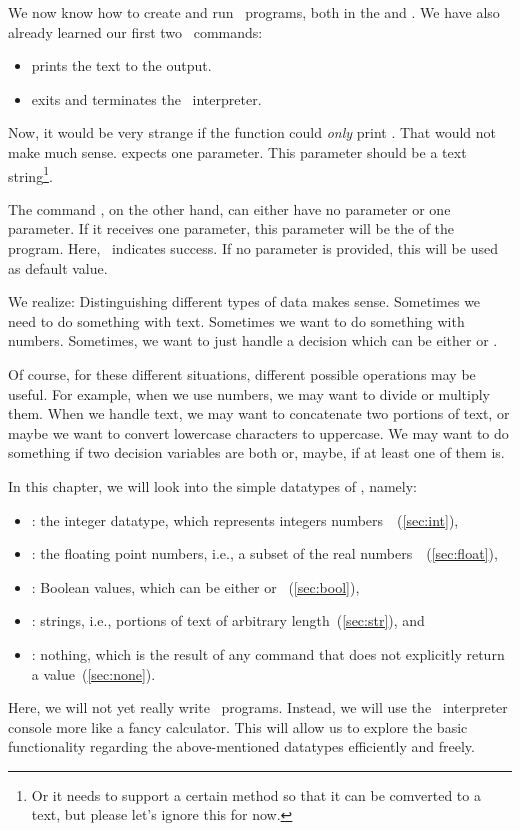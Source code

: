 %
%
We now know how to create and run \python\ programs, both in the  and .
We have also already learned our first two \python\ commands:%
%
\begin{itemize}%
\item {} prints the text  to the output.
\item {} exits and terminates the \python\ interpreter.%
\end{itemize}%
%
Now, it would be very strange if the  function could \emph{only} print .
That would not make much sense.
 expects one parameter.
This parameter should be a text string\footnote{Or it needs to support a certain method so that it can be comverted to a text, but please let's ignore this for now.}.

The command , on the other hand, can either have no parameter or one parameter.
If it receives one parameter, this parameter will be the  of the program.
Here, ~indicates success.
If no parameter is provided, this will be used as default value.

We realize:
Distinguishing different types of data makes sense.
Sometimes we need to do something with text.
Sometimes we want to do something with numbers.
Sometimes, we want to just handle a decision which can be either  or .

Of course, for these different situations, different possible operations may be useful.
For example, when we use numbers, we may want to divide or multiply them.
When we handle text, we may want to concatenate two portions of text, or maybe we want to convert lowercase characters to uppercase.
We may want to do something if two decision variables are both  or, maybe, if at least one of them is.

In this chapter, we will look into the simple datatypes of \python, namely:%
%
\begin{itemize}%
%
\item {}: the integer datatype, which represents integers numbers~\integerNumbers~(\cref{sec:int}),%
\item {}: the floating point numbers, i.e., a subset of the real numbers~\realNumbers~(\cref{sec:float}),%
\item {}: Boolean values, which can be either  or ~(\cref{sec:bool}),%
\item {}: strings, i.e., portions of text of arbitrary length~(\cref{sec:str}), and%
\item {}: nothing, which is the result of any command that does not explicitly return a value~(\cref{sec:none}).%
%
\end{itemize}%
%
Here, we will not yet really write \python\ programs.
Instead, we will use the \python\ interpreter console more like a fancy calculator.
This will allow us to explore the basic functionality regarding the above-mentioned datatypes efficiently and freely.%
%
\endhsection%
%
